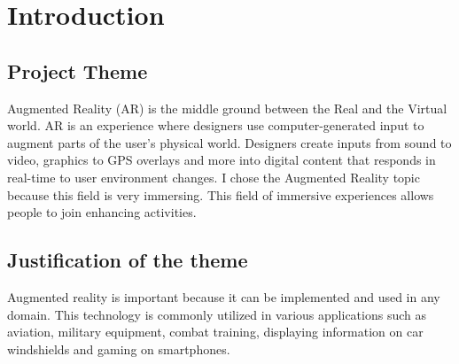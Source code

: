 \chapter{Introduction}\label{cap:introduction}

\section{Project Theme}
Augmented Reality (AR) is the middle ground between the Real and the Virtual world.
AR is an experience where designers use computer-generated input to augment parts of the user's physical world. Designers create inputs from sound to video, graphics to GPS overlays and more into digital content that responds in real-time to user environment changes.
I chose the Augmented Reality topic because this field is very immersing. This field of immersive experiences allows people to join enhancing activities.

\section{ Justification of the theme }
Augmented reality is important because it can be implemented and used in any domain. This technology is commonly utilized in various applications such as aviation, military equipment, combat training, displaying information on car windshields and gaming on smartphones.


